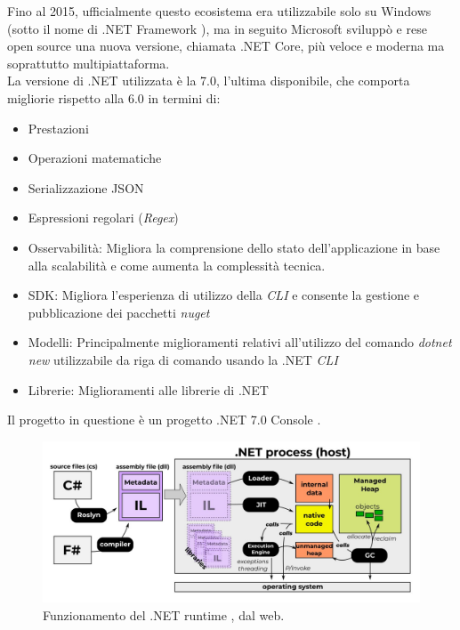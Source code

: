 \documentclass[\main/tesi.tex]{subfiles}
\begin{document}
Fino al 2015, ufficialmente questo ecosistema era utilizzabile solo su Windows (sotto il nome di .NET Framework \cite{dotnet}), ma in seguito Microsoft sviluppò e rese open source una nuova versione, chiamata .NET Core, più veloce e moderna ma soprattutto multipiattaforma. \\
La versione di .NET \cite{dotnet} utilizzata è la 7.0, l'ultima disponibile, che comporta migliorie rispetto alla 6.0 in termini di:
\begin{itemize}
    \item Prestazioni
    \item Operazioni matematiche
    \item Serializzazione JSON
    \item Espressioni regolari (\textit{Regex})
    \item Osservabilità: Migliora la comprensione dello stato dell'applicazione in base alla scalabilità e come aumenta la complessità tecnica.
    \item SDK: Migliora l'esperienza di utilizzo della \textit{CLI} e consente la gestione e pubblicazione dei pacchetti \textit{nuget} \cite{nuget}
    \item Modelli: Principalmente miglioramenti relativi all'utilizzo del comando \textit{dotnet new} utilizzabile da riga di comando usando la .NET \textit{CLI} \cite{dotnet}
    \item Librerie: Miglioramenti alle librerie di .NET \cite{dotnet}
\end{itemize}
Il progetto in questione è un progetto .NET 7.0 Console \cite{dotnet}. \\

\begin{figure}[h]
    \caption{Funzionamento del .NET runtime \cite{dotnet}, dal web.}
    \includegraphics[width=\textwidth]{../images/dotnet.png}
\end{figure}

\newpage
\end{document}

